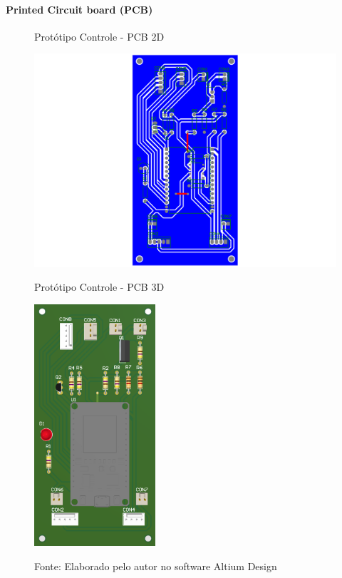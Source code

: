 \documentclass[../delivery_hospital_report.tex]{subfiles}
\begin{document}
\paragraph{Printed Circuit board (PCB)}

\begin{figure}[!ht]
    \centering
    \begin{minipage}{0.5\textwidth}
        \centering
        \caption{Protótipo Controle - PCB 2D}
        \includegraphics[width=1.03\textwidth]{modulos/Controle_Motor-2.png} 
        \label{fig:figura1minipg}
    \end{minipage}\hfill
    \begin{minipage}{0.5\textwidth}
        \centering
        \caption{Protótipo Controle - PCB 3D }
        \includegraphics[width=0.4\textwidth]{modulos/Controle_Motor.png} 
        \label{fig:figura1minipg}
    \end{minipage}\hfill
    
    \caption*{Fonte: Elaborado pelo autor no software Altium Design\cite{altium21} }
    \label{fig:figurasminipg}
\end{figure}
\end{document}
